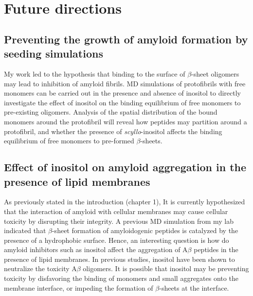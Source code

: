 \section{Future directions}


\subsection{Preventing the growth of amyloid formation by seeding simulations}
My work led to the hypothesis that binding to the surface of $\beta$-sheet oligomers may lead to inhibition of amyloid fibrils.  MD simulations of protofibrils with free monomers can be carried out in the presence and absence of inositol to directly investigate the effect of inositol on the binding equilibrium of free monomers to pre-existing oligomers.  Analysis of the spatial distribution of the bound monomers around the protofibril will reveal how peptides may partition around a protofibril, and whether the presence of \textit{scyllo}-inositol affects the binding equilibrium of free monomers to pre-formed $\beta$-sheets. %

\subsection{Effect of inositol on amyloid aggregation in the presence of lipid membranes}
As previously stated in the introduction (chapter 1), It is currently hypothesized that the interaction of amyloid with cellular membranes may cause cellular toxicity by disrupting their integrity.\cite{Pastor:2008p23}  A previous MD simulation from my lab indicated that $\beta$-sheet formation of amyloidogenic peptides is catalyzed by the presence of a hydrophobic surface.\cite{Nikolic:2010go}  Hence, an interesting question is how do amyloid inhibitors such as inositol affect the aggregation of A$\beta$ peptides in the presence of lipid membranes. In previous studies, inositol have been shown to neutralize the toxicity A$\beta$ oligomers.\cite{McLaurin:2000bq}  It is possible that inositol may be preventing toxicity by disfavoring the binding of monomers and small aggregates onto the membrane interface, or impeding the formation of $\beta$-sheets at the interface.\cite{references}

